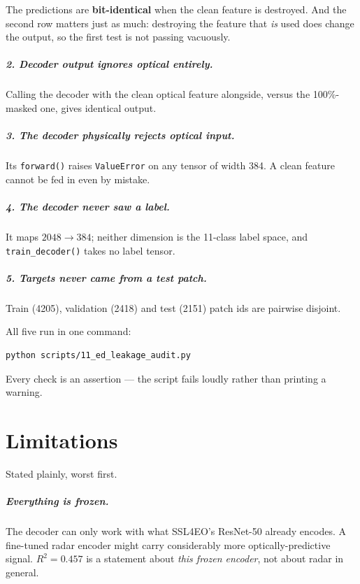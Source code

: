 \documentclass[11pt,a4paper]{report}
\newcommand{\code}[1]{\texttt{\small #1}}
\begin{document}
The predictions are \textbf{bit-identical} when the clean feature is destroyed.
And the second row matters just as much: destroying the feature that
\emph{is} used does change the output, so the first test is not passing
vacuously.

\paragraph{2. Decoder output ignores optical entirely.} Calling the decoder with
the clean optical feature alongside, versus the 100\%-masked one, gives
identical output.

\paragraph{3. The decoder physically rejects optical input.} Its
\code{forward()} raises \code{ValueError} on any tensor of width 384. A clean
feature cannot be fed in even by mistake.

\paragraph{4. The decoder never saw a label.} It maps $2048 \rightarrow 384$;
neither dimension is the 11-class label space, and \code{train\_decoder()} takes
no label tensor.

\paragraph{5. Targets never came from a test patch.} Train (4205), validation
(2418) and test (2151) patch ids are pairwise disjoint.

\begin{codedoes}
All five run in one command:
\begin{lstlisting}
python scripts/11_ed_leakage_audit.py
\end{lstlisting}
Every check is an assertion --- the script fails loudly rather than printing a
warning.
\end{codedoes}

\chapter{Limitations}
\label{ch:lim}

Stated plainly, worst first.

\paragraph{Everything is frozen.} The decoder can only work with what SSL4EO's
ResNet-50 already encodes. A fine-tuned radar encoder might carry considerably
more optically-predictive signal. $R^2 = 0.457$ is a statement about \emph{this
frozen encoder}, not about radar in general.
\end{document}
